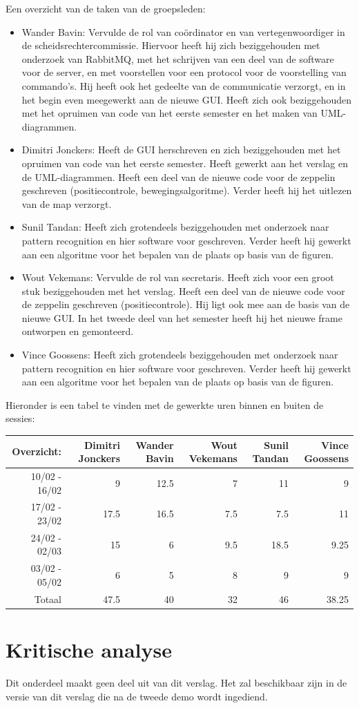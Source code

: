 \documentclass[eind]{penoverslag}
\begin{document}
Een overzicht van de taken van de groepsleden: \\
\begin{itemize}
\item Wander Bavin: Vervulde de rol van co\"ordinator en van vertegenwoordiger in de scheidsrechtercommissie. Hiervoor heeft hij zich beziggehouden met onderzoek van RabbitMQ, met het schrijven van een deel van de software voor de server, en met voorstellen voor een protocol voor de voorstelling van commando's. Hij heeft ook het gedeelte van de communicatie verzorgt, en in het begin even meegewerkt aan de nieuwe GUI. Heeft zich ook beziggehouden met het opruimen van code van het eerste semester en het maken van UML-diagrammen.
\item Dimitri Jonckers: Heeft de GUI herschreven en zich beziggehouden met het opruimen van code van het eerste semester. Heeft gewerkt aan het verslag en de UML-diagrammen. Heeft een deel van de nieuwe code voor de zeppelin geschreven (positiecontrole, bewegingsalgoritme). Verder heeft hij het uitlezen van de map verzorgt.
\item Sunil Tandan: Heeft zich grotendeels beziggehouden met onderzoek naar pattern recognition en hier software voor geschreven. Verder heeft hij gewerkt aan een algoritme voor het bepalen van de plaats op basis van de figuren.
\item Wout Vekemans: Vervulde de rol van secretaris. Heeft zich voor een groot stuk beziggehouden met het verslag. Heeft een deel van de nieuwe code voor de zeppelin geschreven (positiecontrole). Hij ligt ook mee aan de basis van de nieuwe GUI. In het tweede deel van het semester heeft hij het nieuwe frame ontworpen en gemonteerd. 
\item Vince Goossens: Heeft zich grotendeels beziggehouden met onderzoek naar pattern recognition en hier software voor geschreven. Verder heeft hij gewerkt aan een algoritme voor het bepalen van de plaats op basis van de figuren.
\end{itemize}

Hieronder is een tabel te vinden met de gewerkte uren binnen en buiten de sessies: \\

\begin{tabular}{r||r|r|r|r|r}
Overzicht: & Dimitri Jonckers & Wander Bavin & Wout Vekemans & Sunil Tandan & Vince Goossens \\
\hline \hline
10/02 - 16/02 & 9 & 12.5 & 7 & 11 & 9 \\
17/02 - 23/02 & 17.5 & 16.5 & 7.5 & 7.5 & 11 \\
24/02 - 02/03 & 15 & 6 & 9.5 & 18.5 & 9.25 \\
03/02 - 05/02 & 6 & 5 & 8 & 9 & 9 \\
\hline \hline
Totaal & 47.5 & 40 & 32 & 46 & 38.25 \\
\end{tabular}


\section{Kritische analyse}
Dit onderdeel maakt geen deel uit van dit verslag. Het zal beschikbaar zijn in de versie van dit verslag die na de tweede demo wordt ingediend.
\end{document}

